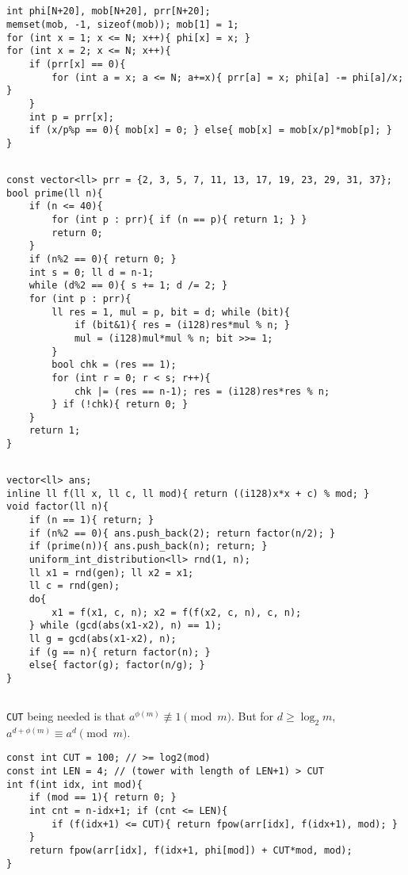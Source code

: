 \documentclass[landscape, 8pt, a4paper, oneside, twocolumn]{extarticle}
\begin{document}
\subsection{}
\begin{verbatim}
int phi[N+20], mob[N+20], prr[N+20];
memset(mob, -1, sizeof(mob)); mob[1] = 1;
for (int x = 1; x <= N; x++){ phi[x] = x; }
for (int x = 2; x <= N; x++){
    if (prr[x] == 0){
        for (int a = x; a <= N; a+=x){ prr[a] = x; phi[a] -= phi[a]/x; }
    }
    int p = prr[x];
    if (x/p%p == 0){ mob[x] = 0; } else{ mob[x] = mob[x/p]*mob[p]; }
}
\end{verbatim}
\subsection{}
\begin{verbatim}
const vector<ll> prr = {2, 3, 5, 7, 11, 13, 17, 19, 23, 29, 31, 37};
bool prime(ll n){
    if (n <= 40){
        for (int p : prr){ if (n == p){ return 1; } }
        return 0;
    }
    if (n%2 == 0){ return 0; }
    int s = 0; ll d = n-1;
    while (d%2 == 0){ s += 1; d /= 2; }
    for (int p : prr){
        ll res = 1, mul = p, bit = d; while (bit){
            if (bit&1){ res = (i128)res*mul % n; }
            mul = (i128)mul*mul % n; bit >>= 1;
        }
        bool chk = (res == 1);
        for (int r = 0; r < s; r++){
            chk |= (res == n-1); res = (i128)res*res % n;
        } if (!chk){ return 0; }
    }
    return 1;
}
\end{verbatim}
\subsection{}
\begin{verbatim}
vector<ll> ans;
inline ll f(ll x, ll c, ll mod){ return ((i128)x*x + c) % mod; }
void factor(ll n){
    if (n == 1){ return; }
    if (n%2 == 0){ ans.push_back(2); return factor(n/2); }
    if (prime(n)){ ans.push_back(n); return; }
    uniform_int_distribution<ll> rnd(1, n);
    ll x1 = rnd(gen); ll x2 = x1;
    ll c = rnd(gen);
    do{
        x1 = f(x1, c, n); x2 = f(f(x2, c, n), c, n);
    } while (gcd(abs(x1-x2), n) == 1);
    ll g = gcd(abs(x1-x2), n);
    if (g == n){ return factor(n); }
    else{ factor(g); factor(n/g); }
}
\end{verbatim}
\subsection{}
\texttt{CUT} being needed is that $a^{\phi(m)} \not\equiv 1 \pmod m$. But for $d \ge \log_2 m$, $a^{d+\phi(m)} \equiv a^{d} \pmod m$.
\begin{verbatim}
const int CUT = 100; // >= log2(mod)
const int LEN = 4; // (tower with length of LEN+1) > CUT
int f(int idx, int mod){
    if (mod == 1){ return 0; }
    int cnt = n-idx+1; if (cnt <= LEN){
        if (f(idx+1) <= CUT){ return fpow(arr[idx], f(idx+1), mod); }
    }
    return fpow(arr[idx], f(idx+1, phi[mod]) + CUT*mod, mod);
}
\end{verbatim}
\end{document}
